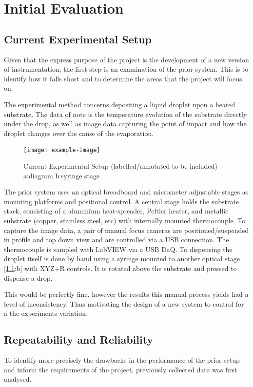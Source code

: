 \chapter{Initial Evaluation}\label{C:init_eval}

\section{Current Experimental Setup}
Given that the express purpose of the project is the development of a new version of instrumentation, the first step is an examination of the prior system. This is to identify how it falls short and to determine the areas that the project will focus on.

The experimental method concerns depositing a liquid droplet upon a heated substrate. The data of note is the temperature evolution of the substrate directly under the drop, as well as image data capturing the point of impact and how the droplet changes over the cause of the evaporation.

\begin{figure}[h]
    \begin{center}
        \texttt{[image: example-image]}
        \caption{Current Experimental Setup (labelled/annotated to be included) a:diagram b:syringe stage}
        \label{fig:prior_exp}
    \end{center}
\end{figure}
The prior system uses an optical breadboard and micrometer adjustable stages as mounting platforms and positional control.
A central stage holds the substrate stack, consisting of a aluminium heat-spreader, Peltier heater, and metallic substrate (copper, stainless steel, etc) with internally mounted thermocouple.
To capture the image data, a pair of manual focus cameras are positioned/suspended in profile and top down view and are controlled via a USB connection. The thermocouple is sampled with LabVIEW via a USB DaQ.
To dispensing the droplet itself is done by hand using a syringe mounted to another optical stage [\ref{fig:prior_exp}:b] with XYZ+R controls. It is rotated above the substrate and pressed to dispense a drop.

This would be perfectly fine, however the results this manual process yields had a level of inconsistency. Thus motivating the design of a new system to control for a the experiments variation.

\newpage
\section{Repeatability and Reliability}
To identify more precisely the drawbacks in the performance of the prior setup and inform the requirements of the project, previously collected data was first analysed. 

